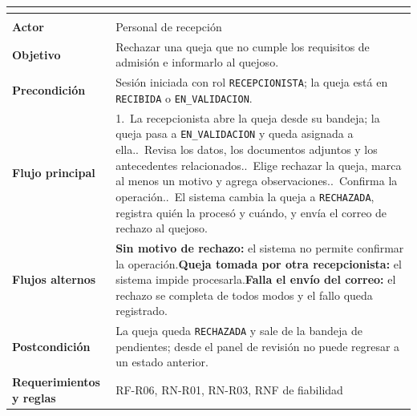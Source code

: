 \begingroup
{}
\small
\renewcommand{\arraystretch}{1.25}
\setlength{\tabcolsep}{4pt}
\begin{longtable}{|L{3.2cm}|L{12.4cm}|}
	\hline
	 \\
	\hline
	\endfirsthead
	\hline
	 \\
	\hline
	\endhead
	\textbf{Actor} & Personal de recepción \\ \hline
	\textbf{Objetivo} & Rechazar una queja que no cumple los requisitos de admisión e informarlo al quejoso. \\ \hline
	\textbf{Precondición} & Sesión iniciada con rol \texttt{RECEPCIONISTA}; la queja está en \texttt{RECIBIDA} o \texttt{EN\_VALIDACION}. \\ \hline
	\textbf{Flujo principal} & 1.~La recepcionista abre la queja desde su bandeja; la queja pasa a \texttt{EN\_VALIDACION} y queda asignada a ella..~Revisa los datos, los documentos adjuntos y los antecedentes relacionados..~Elige rechazar la queja, marca al menos un motivo y agrega observaciones..~Confirma la operación..~El sistema cambia la queja a \texttt{RECHAZADA}, registra quién la procesó y cuándo, y envía el correo de rechazo al quejoso. \\ \hline
	\textbf{Flujos alternos} & \textbf{Sin motivo de rechazo:} el sistema no permite confirmar la operación.\newline \textbf{Queja tomada por otra recepcionista:} el sistema impide procesarla.\newline \textbf{Falla el envío del correo:} el rechazo se completa de todos modos y el fallo queda registrado. \\ \hline
	\textbf{Postcondición} & La queja queda \texttt{RECHAZADA} y sale de la bandeja de pendientes; desde el panel de revisión no puede regresar a un estado anterior. \\ \hline
	\textbf{Requerimientos y reglas} & RF-R06, RN-R01, RN-R03, RNF de fiabilidad \\ \hline
\end{longtable}
\endgroup

